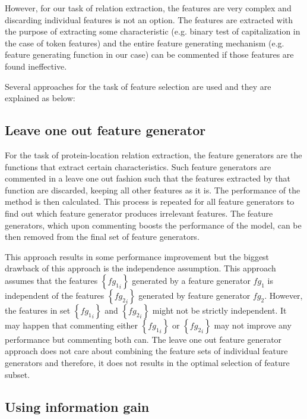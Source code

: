 However, for our task of relation extraction, the features are very complex and discarding individual features is not an option. The features are extracted with the purpose of extracting some characteristic (e.g. binary test of capitalization in the case of token features) and the entire feature generating mechanism (e.g.  feature generating function in our case) can be commented if those features are found ineffective.

Several approaches for the task of feature selection are used and they are explained as below:

\subsection{Leave one out feature generator}\label{subsec:LeaveOneOut}

For the task of protein-location relation extraction, the feature generators are the functions that extract certain characteristics. Such feature generators are commented in a leave one out fashion such that the features extracted by that function are discarded, keeping all other features as it is. The performance of the method is then calculated. This process is repeated for all feature generators to find out which feature generator produces irrelevant features. The feature generators, which upon commenting boosts the performance of the model, can be then removed from the final set of feature generators.

This approach results in some performance improvement but the biggest drawback of this approach is the independence assumption. This approach assumes that the features $\left\lbrace {fg_1}_i \right\rbrace$ generated by a feature generator $fg_1$ is independent of the features $\left\lbrace {fg_2}_i \right\rbrace$ generated by feature generator $fg_2$. However, the features in set $\left\lbrace {fg_1}_i \right\rbrace$ and $\left\lbrace {fg_2}_i \right\rbrace$ might not be strictly independent. It may happen that commenting either $\left\lbrace {fg_1}_i \right\rbrace$ or $\left\lbrace {fg_2}_i \right\rbrace$ may not improve any performance but commenting both can. The leave one out feature generator approach does not care about combining the feature sets of individual feature generators and therefore, it does not results in the optimal selection of feature subset.

\subsection{Using information gain}\label{subsec:IG}

